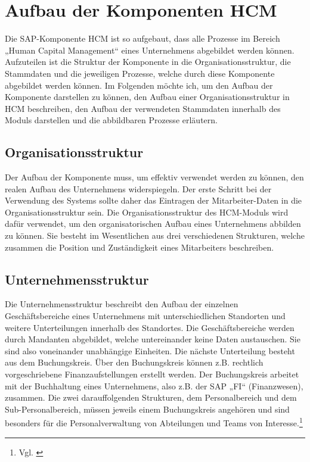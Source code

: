 
\section{Aufbau der Komponenten HCM} 
\label{sec:aufbauderkomponenten}

Die SAP-Komponente HCM ist so aufgebaut, dass alle Prozesse im Bereich „Human Capital Management“ eines Unternehmens abgebildet werden können.
Aufzuteilen ist die Struktur der Komponente in die Organisationsstruktur, die Stammdaten und die jeweiligen Prozesse, welche durch diese Komponente abgebildet werden können.
Im Folgenden möchte ich, um den Aufbau der Komponente darstellen zu können, den Aufbau einer Organisationsstruktur in HCM beschreiben, den Aufbau der verwendeten Stammdaten innerhalb des Moduls darstellen und die abbildbaren Prozesse erläutern.

\subsection{Organisationsstruktur}
Der Aufbau der Komponente muss, um effektiv verwendet werden zu können, den realen Aufbau des Unternehmens widerspiegeln.
Der erste Schritt bei der Verwendung des Systems sollte daher das Eintragen der Mitarbeiter-Daten in die Organisationsstruktur sein.
Die Organisationsstruktur des HCM-Moduls wird dafür verwendet, um den organisatorischen Aufbau eines Unternehmens abbilden zu können.
Sie besteht im Wesentlichen aus drei verschiedenen Strukturen, welche zusammen die Position und Zuständigkeit eines Mitarbeiters beschreiben.

\subsection{Unternehmensstruktur}
Die Unternehmensstruktur beschreibt den Aufbau der einzelnen Geschäftsbereiche eines Unternehmens mit unterschiedlichen Standorten und weitere Unterteilungen innerhalb des Standortes.
Die Geschäftsbereiche werden durch Mandanten abgebildet, welche untereinander keine Daten austauschen.
Sie sind also voneinander unabhängige Einheiten. Die nächste Unterteilung besteht aus dem Buchungskreis.
Über den Buchungskreis können z.B. rechtlich vorgeschriebene Finanzaufstellungen erstellt werden.
Der Buchungskreis arbeitet mit der Buchhaltung eines Unternehmens, also z.B. der SAP „FI“ (Finanzwesen), zusammen.
Die zwei darauffolgenden Strukturen, dem Personalbereich und dem Sub-Personalbereich, müssen jeweils einem Buchungskreis angehören und sind besonders für die Personalverwaltung von Abteilungen und Teams von Interesse.\footnote{Vgl. \cite{SAPSE2024a}}

